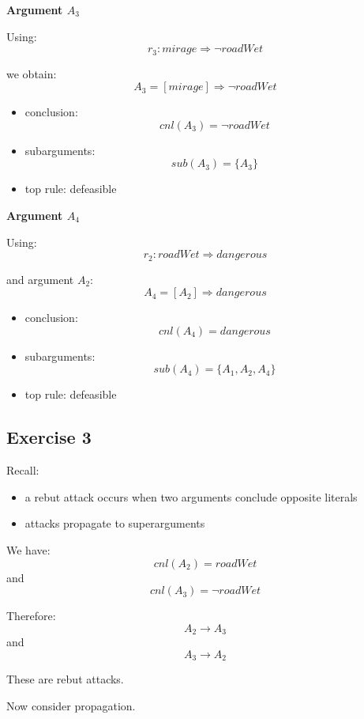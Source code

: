 \documentclass[11pt]{article}
\begin{document}
\bigskip

\textbf{Argument $A_3$}

Using:
\[
r_3: mirage \Rightarrow \neg roadWet
\]

we obtain:
\[
A_3=[mirage]\Rightarrow \neg roadWet
\]

\begin{itemize}
    \item conclusion:
    \[
    cnl(A_3)=\neg roadWet
    \]

    \item subarguments:
    \[
    sub(A_3)=\{A_3\}
    \]

    \item top rule:
    defeasible
\end{itemize}

\bigskip

\textbf{Argument $A_4$}

Using:
\[
r_2: roadWet \Rightarrow dangerous
\]

and argument $A_2$:
\[
A_4=[A_2]\Rightarrow dangerous
\]

\begin{itemize}
    \item conclusion:
    \[
    cnl(A_4)=dangerous
    \]

    \item subarguments:
    \[
    sub(A_4)=\{A_1,A_2,A_4\}
    \]

    \item top rule:
    defeasible
\end{itemize}

\subsection{Exercise 3}

Recall:
\begin{itemize}
    \item a rebut attack occurs when two arguments conclude opposite literals
    \item attacks propagate to superarguments
\end{itemize}

\bigskip

We have:
\[
cnl(A_2)=roadWet
\]
and
\[
cnl(A_3)=\neg roadWet
\]

Therefore:
\[
A_2 \to A_3
\]
and
\[
A_3 \to A_2
\]

These are rebut attacks.

\bigskip

Now consider propagation.
\end{document}

